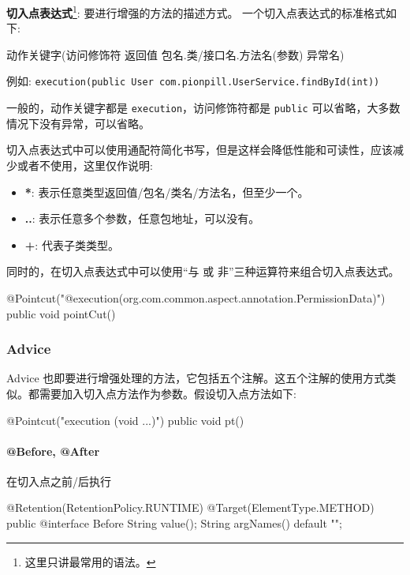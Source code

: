 \textbf{切入点表达式}\footnote{这里只讲最常用的语法。}: 要进行增强的方法的描述方式。 一个切入点表达式的标准格式如下:

\begin{center}
动作关键字(访问修饰符  返回值 包名.类/接口名.方法名(参数) 异常名)
\end{center}

例如: \texttt{execution(public User com.pionpill.UserService.findById(int))}

一般的，动作关键字都是 \texttt{execution}，访问修饰符都是 \texttt{public} 可以省略，大多数情况下没有异常，可以省略。

切入点表达式中可以使用通配符简化书写，但是这样会降低性能和可读性，应该减少或者不使用，这里仅作说明:

\begin{itemize}
    \item \textbf{*}: 表示任意类型返回值/包名/类名/方法名，但至少一个。
    \item \textbf{..}: 表示任意多个参数，任意包地址，可以没有。
    \item \textbf{+}: 代表子类类型。
\end{itemize}

同时的，在切入点表达式中可以使用``与 或 非''三种运算符来组合切入点表达式。

\begin{Java}
@Pointcut("@execution(org.com.common.aspect.annotation.PermissionData)")
public void pointCut() { }
\end{Java}

\subsubsection{Advice}

Advice 也即要进行增强处理的方法，它包括五个注解。这五个注解的使用方式类似。都需要加入切入点方法作为参数。假设切入点方法如下:

\begin{Java}
@Pointcut("execution (void ...)")
public void pt() { }
\end{Java}

\paragraph*{@Before, @After} 在切入点之前/后执行

\begin{Java}
@Retention(RetentionPolicy.RUNTIME)
@Target(ElementType.METHOD)
public @interface Before {
    String value();
    String argNames() default "";
}
\end{Java}

